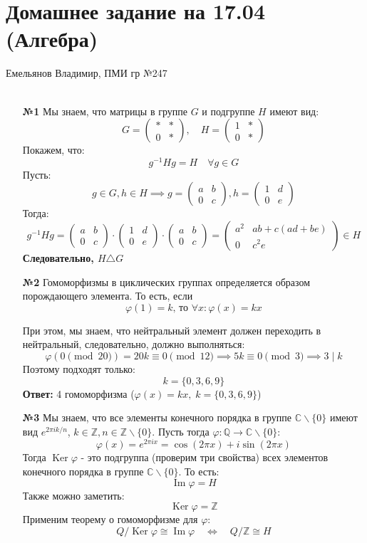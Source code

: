 \documentclass[a4paper]{article}
\newcommand{\mat}[1]{\begin{pmatrix} #1 \end{pmatrix}}
\newcommand{\Ker}{\operatorname{Ker}}
\renewcommand{\Im}{\operatorname{Im}}
\renewcommand{\phi}{\varphi}
\newcommand{\lr}{\Leftrightarrow}
\newcommand{\CC}{\mathbb{C}}
\newcommand{\QQ}{\mathbb{Q}}
\newcommand{\ZZ}{\mathbb{Z}}
\newcommand{\divides}{\;|\;}
\begin{document}
\section*{Домашнее задание на 17.04 (Алгебра)}
 {\large Емельянов Владимир, ПМИ гр №247}\\\\
\begin{enumerate}
    \item[\textbf{№1}]Мы знаем, что матрицы в группе $G$ и подгруппе $H$ имеют вид:
    $$G = \mat{* & * \\0 & *}, \quad H = \mat{1 & * \\0 & *}$$
    Покажем, что:
    $$g^{-1}Hg = H \quad \forall g \in G$$
    Пусть:
    $$g \in G, h \in H \implies g = \mat{a & b\\0 & c}, h = \mat{1 & d \\ 0 & e}$$
    Тогда:
    $$g^{-1}Hg = \mat{a & b\\0 & c} \cdot \mat{1 & d \\ 0 & e} \cdot  \mat{a & b\\0 & c}  = \begin{pmatrix}
        a^2 & ab + c(ad + be) \\
        0 & c^2e
        \end{pmatrix}  \in H$$
    \textbf{Следовательно, $H \triangle G$}

    \item[\textbf{№2}]Гомоморфизмы в циклических группах определяется образом порождающего элемента. 
    То есть, если $$\text{$\phi(1) = k$, то $\forall x: \phi(x) = kx$}$$

    При этом, мы знаем, что нейтральный элемент должен переходить в нейтральный,
     следовательно, должно выполняться:
    $$\phi(0 \pmod{20}) = 20k \equiv 0 \pmod{12} \implies 5k \equiv 0 \pmod{3} \implies 3 \divides k $$
    Поэтому подходят только:
    $$k = \{0, 3, 6, 9\}$$
    \textbf{Ответ: } 4 гомоморфизма ($\phi(x) = kx, \;k = \{0, 3, 6, 9\}$)\\

    \item[\textbf{№3}]Мы знаем, что все элементы конечного порядка в группе 
    $\CC\backslash \{0\}$ имеют вид $e^{2\pi i k/n}$, 
    $k\in \ZZ, n \in \ZZ \backslash \{0\}$.
    Пусть тогда $\phi: \QQ \to \CC\backslash \{0\}$:
    $$\phi(x) = e^{2\pi i x} = \cos(2\pi x)+i\sin(2 \pi x)$$
    Тогда $\Ker \phi$ - это подгруппа (проверим три свойства) всех элементов конечного 
    порядка в группе $\CC\backslash \{0\}$. То есть:
    $$\Im \phi = H$$
    Также можно заметить:
    $$\Ker \phi = \ZZ$$
    Применим теорему о гомоморфизме для $\phi$:
    $$Q / \Ker \phi \cong \Im \phi \quad \lr \quad  Q / \ZZ \cong H$$\\
    

\end{enumerate}
\end{document}
